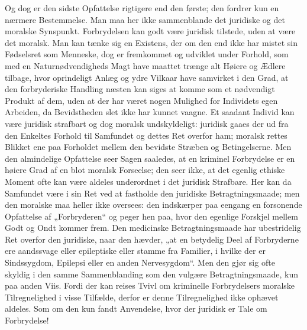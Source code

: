 \documentclass[12pt,a4paper,openany]{book}
\newcommand{\opage}[1]{\marginnote{\footnotesize\textit{[#1]}}}
\begin{document}
Og dog er den sidste Opfattelse rigtigere end den første;
den fordrer kun en nærmere Bestemmelse. Man maa her
ikke sammenblande det juridiske og det moralske Synspunkt.
Forbrydelsen kan godt være juridisk tilstede, uden at være
det moralsk. Man kan tænke sig en Existens, der om den
end ikke har mistet sin Fødselsret som Menneske, dog er
fremkommet og udviklet under Forhold, som med en Naturnødvendigheds
Magt have maattet trænge alt Høiere og
Ædlere tilbage, hvor oprindeligt Anlæg og ydre Vilkaar have
samvirket i den Grad, at den forbryderiske Handling næsten
kan siges at komme som et nødvendigt Produkt af dem, uden
at der har været nogen Mulighed for Individets egen Arbeiden,
da Bevidstheden slet ikke har kunnet vaagne. Et
saadant Individ kan være juridisk strafbart og dog moralsk
\opage{332}undskyldeligt: juridisk gaaes der ud fra den Enkeltes Forhold
til Samfundet og dettes Ret overfor ham; moralsk rettes
Blikket ene paa Forholdet mellem den bevidste Stræben og
Betingelserne. Men den almindelige Opfattelse seer Sagen
saaledes, at en kriminel Forbrydelse er en høiere Grad af en
blot moralsk Forseelse; den seer ikke, at det egenlig ethiske
Moment ofte kan være aldeles underordnet i det juridisk
Strafbare. Her kan da Samfundet være i sin Ret ved at
fastholde den juridiske Betragtningsmaade; men den moralske
maa heller ikke oversees: den indskærper paa eengang en forsonende
Opfattelse af „Forbryderen“ og peger hen paa, hvor
den egenlige Forskjel mellem Godt og Ondt kommer frem.
Den medicinske Betragtningsmaade har ubestridelig Ret overfor
den juridiske, naar den hævder, „at en betydelig Deel af
Forbryderne ere aandssvage eller epileptiske eller stamme fra
Familier, i hvilke der er Sindssygdom, Epilepsi eller en
anden Nervesygdom“. Men den gjør sig ofte skyldig i den samme
Sammenblanding som den vulgære Betragtningsmaade, kun
paa anden Viis. Fordi der kan reises Tvivl om kriminelle
Forbrydelsers moralske Tilregnelighed i visse Tilfælde, derfor
er denne Tilregnelighed ikke ophævet aldeles. Som om
den kun fandt Anvendelse, hvor der juridisk er Tale om
Forbrydelse!
\end{document}
